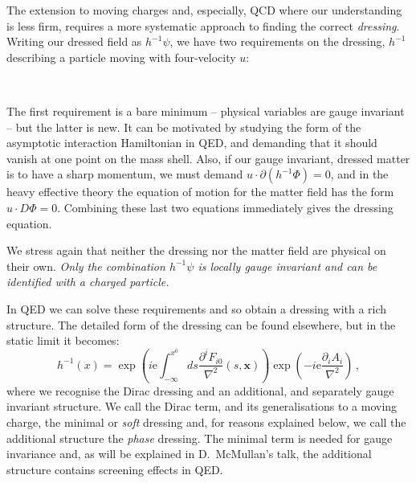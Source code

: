 \documentclass[12pt,a4paper]{article}
\newcommand{\xb}{{\boldsymbol x}}
\newcommand{\ex}{{\mathrm{e}}}
\newcommand{\pa}{\partial}
\begin{document}
The extension to moving charges and, especially, QCD where our understanding is less firm, requires a more
systematic approach to finding the correct \emph{dressing}. Writing our dressed field as $h^{-1}\psi$,
we have two requirements\cite{Bagan:1998kg}
on the dressing, $h^{-1}$ describing a particle moving with four-velocity $u$:\\[2mm]
\begin{center}
\begin{minipage}{.97\linewidth}\begin{center}\end{center}
\end{minipage}\\[3mm]\end{center}
The first requirement is a bare minimum -- physical variables are gauge invariant -- but the latter
is new. It can be motivated  by studying the form of the asymptotic interaction Hamiltonian
in QED, and demanding that it should vanish at one point on the mass shell.
Also, if our gauge invariant, dressed matter is to have a sharp momentum, we must demand
$u\cdot \partial (h^{-1}\Phi)=0$, and in the heavy effective
theory the equation of motion for the matter field has the form $u\cdot D\Phi=0$. Combining
these last two equations immediately gives the dressing equation.

We stress again that neither the dressing nor the matter field are physical on their own. \emph{Only
the combination $h^{-1}\psi$ is locally gauge invariant and can be identified with a charged particle.}

In QED we can solve these requirements and so obtain a dressing with a rich structure. The detailed
form of the dressing can be found elsewhere, but in the static limit it becomes:
\begin{equation}
  h^{-1}(x)=\exp\left(i\ex\int_{-\infty}^{x^0}\!ds
  \frac{\pa^iF_{i0}}{\nabla^2}(s,\xb)\right)
  \exp\left(-i\ex\frac{\pa_i A_i}{\nabla^2}\right)\,,
\end{equation}
where we recognise the Dirac dressing and an additional, and separately gauge invariant structure.
We call the Dirac term, and its generalisations to a moving charge, the minimal or \emph{soft} dressing
and, for reasons explained below, we call the additional structure the \emph{phase} dressing.
The minimal term is needed for gauge invariance and, as will be explained in D.~McMullan's talk, the additional
structure contains screening effects in QED.
\end{document}
